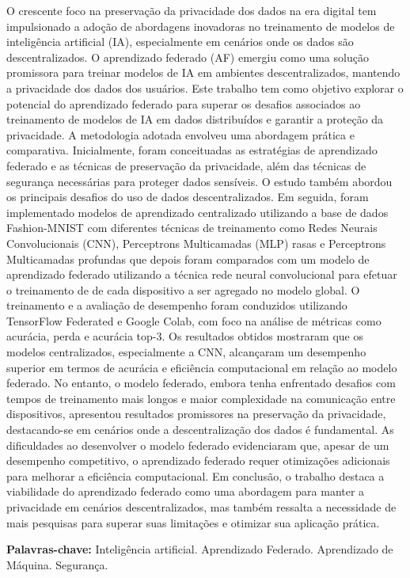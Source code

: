 \begin{resumo}

O crescente foco na preservação da privacidade dos dados na era digital tem impulsionado a adoção de abordagens inovadoras no treinamento de modelos de inteligência artificial (IA), especialmente em cenários onde os dados são descentralizados. O aprendizado federado (AF) emergiu como uma solução promissora para treinar modelos de IA em ambientes descentralizados, mantendo a privacidade dos dados dos usuários. Este trabalho tem como objetivo explorar o potencial do aprendizado federado para superar os desafios associados ao treinamento de modelos de IA em dados distribuídos e garantir a proteção da privacidade. A metodologia adotada envolveu uma abordagem prática e comparativa. Inicialmente, foram conceituadas as estratégias de aprendizado federado e as técnicas de preservação da privacidade, além das técnicas de segurança necessárias para proteger dados sensíveis. O estudo também abordou os principais desafios do uso de dados descentralizados. Em seguida, foram implementado modelos de aprendizado centralizado utilizando a base de dados Fashion-MNIST com diferentes técnicas de treinamento como Redes Neurais Convolucionais (CNN), Perceptrons Multicamadas (MLP) rasas e Perceptrons Multicamadas profundas que depois foram comparados com um modelo de aprendizado federado utilizando a técnica rede neural convolucional para efetuar o treinamento de de cada dispositivo a ser agregado no modelo global. O treinamento e a avaliação de desempenho foram conduzidos utilizando TensorFlow Federated e Google Colab, com foco na análise de métricas como acurácia, perda e acurácia top-3. Os resultados obtidos mostraram que os modelos centralizados, especialmente a CNN, alcançaram um desempenho superior em termos de acurácia e eficiência computacional em relação ao modelo federado. No entanto, o modelo federado, embora tenha enfrentado desafios com tempos de treinamento mais longos e maior complexidade na comunicação entre dispositivos, apresentou resultados promissores na preservação da privacidade, destacando-se em cenários onde a descentralização dos dados é fundamental. As dificuldades ao desenvolver o modelo federado evidenciaram que, apesar de um desempenho competitivo, o aprendizado federado requer otimizações adicionais para melhorar a eficiência computacional. Em conclusão, o trabalho destaca a viabilidade do aprendizado federado como uma abordagem para manter a privacidade em cenários descentralizados, mas também ressalta a necessidade de mais pesquisas para superar suas limitações e otimizar sua aplicação prática.

\vspace{\onelineskip}
    
\noindent
\textbf{Palavras-chave:} Inteligência artificial. Aprendizado Federado. Aprendizado de Máquina. Segurança.
\end{resumo}